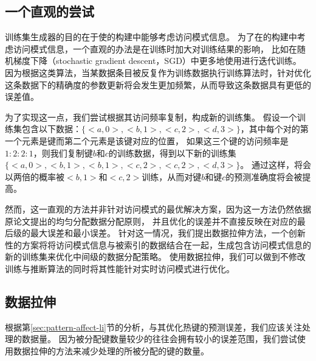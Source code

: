 \subsection{一个直观的尝试}
\label{sec:pattern-intuitive}

训练集生成器的目的在于使{\li}的构建中能够考虑访问模式信息。
为了在{\li}的构建中考虑访问模式信息，一个直观的办法是在训练时加大{\hotkey}对训练结果的影响，
比如在随机梯度下降（stochastic gradient descent，SGD）中更多地使用{\hotkey}进行迭代训练。
因为根据这类算法，当某数据条目被反复作为训练数据执行训练算法时，针对优化这条数据下的精确度的参数更新将会发生更加频繁，从而导致这条数据具有更低的误差值。

为了实现这一点，我们尝试根据其访问频率复制{\hotkey}，构成新的训练集。
假设一个训练集包含以下数据：$\{<a, 0>, <b, 1>, <c, 2>, <d, 3>\}$，其中每个对的第一个元素是键而第二个元素是该键对应的位置，
如果这三个键的访问频率是$1:2:2:1$，则我们复制键$b$和$c$的训练数据，得到以下新的训练集$\{<a, 0>, <b, 1>, <b, 1>, <c, 2>, <c, 2>, <d, 3>\}$。
通过这样，{\model}将会以两倍的概率被$<b, 1>$和$<c, 2>$训练，从而对键$b$和键$c$的预测准确度将会被提高。


然而，这一直观的方法并非针对访问模式的最优解决方案，因为这一方法仍然依据原论文提出的均匀分配数据分配原则，
并且优化{\hotkey}的误差并不直接反映在对应的{\rmi}最后级{\model}的最大误差和最小误差。
针对这一情况，我们提出数据拉伸方法，一个创新性的方案将将访问模式信息与被索引的数据结合在一起，生成包含访问模式信息的新的训练集来优化{\rmi}中间级的数据分配策略。
使用数据拉伸，我们可以做到不修改{\rmi}训练与推断算法的同时将其性能针对实时访问模式进行优化。

\subsection{数据拉伸}

根据第\ref{sec:pattern-affect-li}节的分析，与其优化热键的预测误差，我们应该关注处理{\hotkey}{\model}的数据量。
因为被分配键数量较少的{\model}往往会拥有较小的误差范围，我们尝试使用数据拉伸的方法来减少处理{\hotkey}的{\model}所被分配的键的数量。

